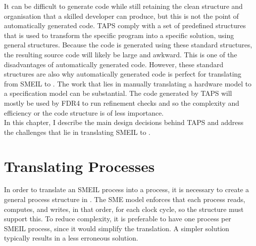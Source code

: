 It can be difficult to generate code while still retaining the clean structure and organisation that a skilled developer can produce, but this is not the point of automatically generated code. TAPS comply with a set of predefined structures that is used to transform the specific program into a specific solution, using general structures. Because the code is generated using these standard structures, the resulting source code will likely be large and awkward. This is one of the disadvantages of automatically generated code. However, these standard structures are also why automatically generated code is perfect for translating from SMEIL to \cspm{}. The work that lies in manually translating a hardware model to a specification model can be substantial. The code generated by TAPS will mostly be used by FDR4 to run refinement checks and so the complexity and efficiency or the code structure is of less importance.\\

In this chapter, I describe the main design decisions behind TAPS and address the challenges that lie in translating SMEIL to \cspm{}.
\section{Translating Processes}
In order to translate an SMEIL process into a \cspm{} process, it is necessary to create a general process structure in \cspm{}. The SME model enforces that each process reads, computes, and writes, in that order, for each clock cycle, so the \cspm{} structure must support this. To reduce complexity, it is preferable to have one \cspm{} process per SMEIL process, since it would simplify the translation. A simpler solution typically results in a less erroneous solution.\\

